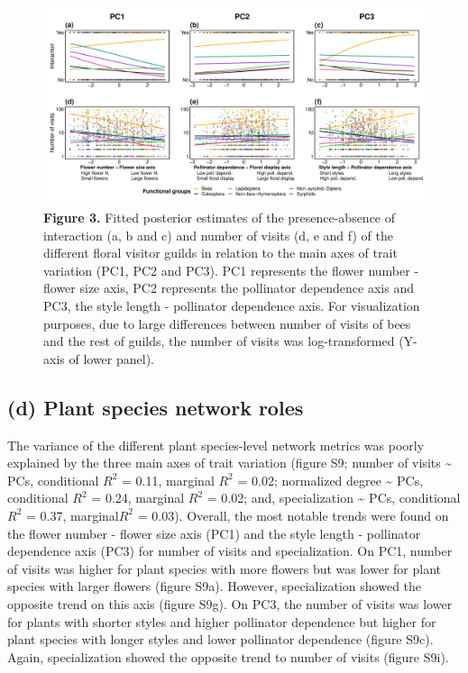 \documentclass[
  12pt,
  a4paper,
]{article}
\newcommand{\blandscape}{\begin{landscape}}
\newcommand{\elandscape}{\end{landscape}}
\begin{document}
\vspace{5mm}
\blandscape

\begin{figure}
\centering
\includegraphics{output/figures/unnamed-chunk-4-1.pdf}
\caption{\label{fig:unnamed-chunk-4}\textbf{Figure 3.} Fitted posterior estimates of the presence-absence of interaction (a, b and c) and number of visits (d, e and f) of the different floral visitor guilds in relation to the main axes of trait variation (PC1, PC2 and PC3). PC1 represents the flower number - flower size axis, PC2 represents the pollinator dependence axis and PC3, the style length - pollinator dependence axis. For visualization purposes, due to large differences between number of visits of bees and the rest of guilds, the number of visits was log-transformed (Y-axis of lower panel).}
\end{figure}

\elandscape

\hypertarget{d-plant-species-network-roles}{%
\subsection{(d) Plant species network roles}\label{d-plant-species-network-roles}}

The variance of the different plant species-level network metrics was poorly explained by the three main axes of trait variation (figure S9; number of visits \textasciitilde{} PCs, conditional \(R^{2}\) = 0.11, marginal \(R^{2}\) = 0.02; normalized degree \textasciitilde{} PCs, conditional \(R^{2}\) = 0.24, marginal \(R^{2}\) = 0.02; and, specialization \textasciitilde{} PCs, conditional \(R^{2}\) = 0.37, marginal\(R^{2}\) = 0.03). Overall, the most notable trends were found on the flower number - flower size axis (PC1) and the style length - pollinator dependence axis (PC3) for number of visits and specialization. On PC1, number of visits was higher for plant species with more flowers but was lower for plant species with larger flowers (figure S9a). However, specialization showed the opposite trend on this axis (figure S9g). On PC3, the number of visits was lower for plants with shorter styles and higher pollinator dependence but higher for plant species with longer styles and lower pollinator dependence (figure S9c). Again, specialization showed the opposite trend to number of visits (figure S9i).
\end{document}
